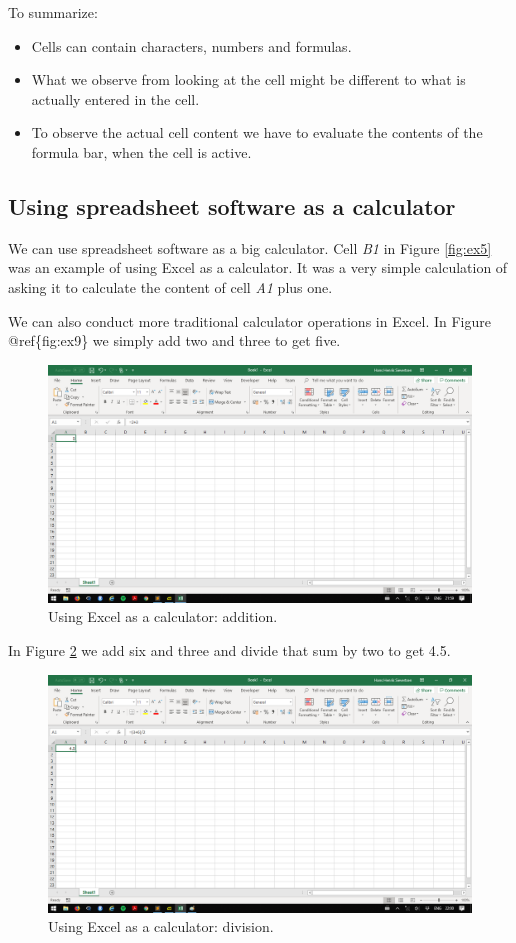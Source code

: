 \documentclass[]{book}
\providecommand{\tightlist}{%
  \setlength{\itemsep}{0pt}\setlength{\parskip}{0pt}}
\begin{document}
To summarize:

\begin{itemize}
\tightlist
\item
  Cells can contain characters, numbers and formulas.
\item
  What we observe from looking at the cell might be different to what is actually entered in the cell.
\item
  To observe the actual cell content we have to evaluate the contents of the formula bar, when the cell is active.
\end{itemize}

\hypertarget{using-spreadsheet-software-as-a-calculator}{%
\subsection{Using spreadsheet software as a calculator}\label{using-spreadsheet-software-as-a-calculator}}

We can use spreadsheet software as a big calculator. Cell \emph{B1} in Figure \ref{fig:ex5} was an example of using Excel as a calculator. It was a very simple calculation of asking it to calculate the content of cell \emph{A1} plus one.

We can also conduct more traditional calculator operations in Excel. In Figure @ref\{fig:ex9\} we simply add two and three to get five.

\begin{figure}

{\centering \includegraphics[width=0.6\linewidth]{_resources/chapter_excelbasic/c1} 

}

\caption{Using Excel as a calculator: addition.}\label{fig:ex9}
\end{figure}

In Figure \ref{fig:ex10} we add six and three and divide that sum by two to get 4.5.

\begin{figure}

{\centering \includegraphics[width=0.6\linewidth]{_resources/chapter_excelbasic/c2} 

}

\caption{Using Excel as a calculator: division.}\label{fig:ex10}
\end{figure}
\end{document}
